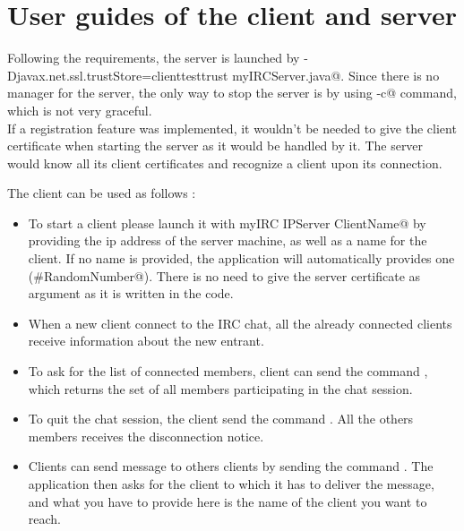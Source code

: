 \documentclass{article}
\begin{document}
\section{User guides of the client and server}
Following the requirements, the server is launched by \verb@java -Djavax.net.ssl.trustStore=clienttesttrust myIRCServer.java@. Since there is no manager for the server, the only way to stop the server is by using \verb@ctrl-c@ command, which is not very graceful.\\
If a registration feature was implemented, it wouldn't be needed to give the client certificate when starting the server as it would be handled by it. The server would know all its client certificates and recognize a client upon its connection.

The client can be used as follows : 
\begin{itemize}
\item To start a client please launch it with \verb@java myIRC IPServer ClientName@ by providing the ip address of the server machine, as well as a name for the client. If no name is provided, the application will automatically provides one (\verb@guest#RandomNumber@). There is no need to give the server certificate as argument as it is written in the code.
\item When a new client connect to the IRC chat, all the already connected clients receive information about the new entrant.
\item To ask for the list of connected members, client can send the command \verb@who@, which returns the set of all members participating in the chat session.
\item To quit the chat session, the client send the command \verb@quit@. All the others members receives the disconnection notice.
\item Clients can send message to others clients by sending the command \verb@msg@. The application then asks for the client to which it has to deliver the message, and what you have to provide here is the name of the client you want to reach.
\end{itemize}
\end{document}
